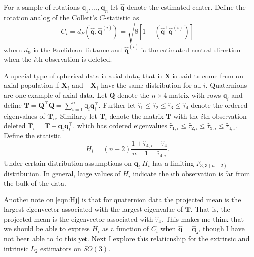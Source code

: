 \documentclass{article}\usepackage[]{graphicx}\usepackage[]{color}
\newcommand{\qest}{{\hat{\bm q}}}
\begin{document}
For a sample of rotations $\bm q_1,\dots,\bm q_n$ let $\qest$ denote the estimated center.  Define the rotation analog of the Collett's $C$-statistic as 
\begin{equation}\label{eqn:Ci}
C_i=d_E(\qest,\hat{\bm q}^{(i)})=\sqrt{8[1-(\qest^\top\qest^{(i)})]}
\end{equation}
where $d_E$ is the Euclidean distance and $\qest^{(i)}$ is the estimated central direction when the $i$th observation is deleted.  

A special type of spherical data is axial data, that is $\bm X$ is said to come from an axial population if $\bm X_i$ and $-\bm X_i$ have the same distribution for all $i$.  Quaternions are one example of axial data.  Let $\bm Q$ denote the $n\times 4$ matrix with rows $\bm q_i$ and define $\bm T=\bm Q^\top\bm Q=\sum_{i=1}^n\bm q_i\bm q_i^\top$.  Further let $\hat\tau_1\leq\hat\tau_2\leq\hat\tau_3\leq\hat\tau_4$ denote the ordered eigenvalues of $\bm T_n$.  Similarly let $\bm T_{i}$ denote the matrix $\bm T$ with the $i$th observation deleted $\bm T_i=\bm T-\bm q_i\bm q_i^\top$, which has ordered eigenvalues $\hat\tau_{1,i}\leq\hat\tau_{2,i}\leq\hat\tau_{3,i}\leq\hat\tau_{4,i}$.  Define the statistic
\begin{equation}\label{eqn:Hj}
H_i=(n-2)\frac{1+\hat\tau_{4,i}-\hat\tau_4}{n-1-\hat\tau_{4,i}}.
\end{equation}
Under certain distribution assumptions on $\bm q_i$  $H_i$ has a limiting $F_{3,3(n-2)}$ distribution.  In general, large values of $H_i$ indicate the $i$th observation is far from the bulk of the data.

Another note on \eqref{eqn:Hj} is that for quaternion data the projected mean is the largest eigenvector associated with the largest eigenvalue of $\bm T$.  That is, the projected mean is the eigenvector associated with $\hat\tau_4$.  This makes me think that we should be able to express $H_i$ as a function of $C_i$ when $\qest=\hat{\bm q}_2$, though I have not been able to do this yet.  Next I explore this relationship for the extrinsic and intrinsic $L_2$ estimators on $SO(3)$. 

\end{document}
